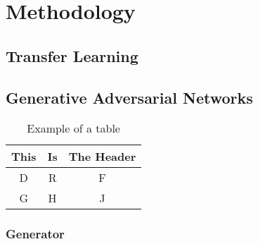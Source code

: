 \section{Methodology}

\subsection{Transfer Learning}

\lipsum[3]

\subsection{Generative Adversarial Networks}

\lipsum[1]

\begin{table}[ht]
    \centering
    \begin{tabular}{ccc}
        \hline
        This & Is & The Header\\
        \hline
        D & R & F\\
        G & H & J\\
        \hline
    \end{tabular}
    \caption{Example of a table}
    \label{tab:example}
\end{table}

\subsubsection{Generator}

\lipsum[6]